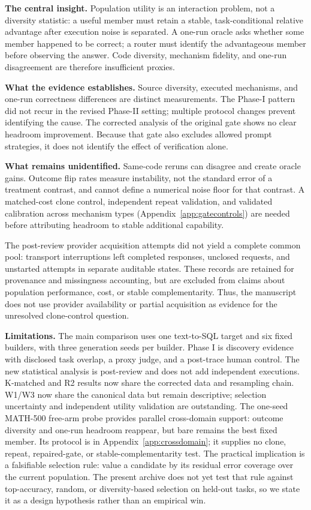 \textbf{The central insight.} Population utility is an interaction
problem, not a diversity statistic: a useful member must retain a stable,
task-conditional relative advantage after execution noise is separated. A
one-run oracle asks whether some member happened to be correct; a router must
identify the advantageous member before observing the answer. Code diversity,
mechanism fidelity, and one-run disagreement are therefore insufficient proxies.

\textbf{What the evidence establishes.} Source diversity, executed
mechanisms, and one-run correctness differences are distinct measurements.
The Phase-I pattern did not recur in the revised Phase-II setting; multiple
protocol changes prevent identifying the cause. The corrected analysis of
the original gate shows no clear headroom improvement. Because that gate
also excludes allowed prompt strategies, it does not identify the effect
of verification alone.

\textbf{What remains unidentified.} Same-code reruns can disagree and
create oracle gains. Outcome flip rates measure instability, not the
standard error of a treatment contrast, and cannot define a numerical
noise floor for that contrast. A matched-cost clone control, independent
repeat validation, and validated calibration across mechanism types
(Appendix~\ref{app:gatecontrols})
are needed before attributing headroom to stable additional capability.


The post-review provider acquisition attempts did not yield a complete common pool: transport interruptions left completed responses, unclosed requests, and unstarted attempts in separate auditable states. These records are retained for provenance and missingness accounting, but are excluded from claims about population performance, cost, or stable complementarity. Thus, the manuscript does not use provider availability or partial acquisition as evidence for the unresolved clone-control question.

\textbf{Limitations.} The main comparison uses one text-to-SQL target and
six fixed builders, with three generation seeds per builder. Phase I is
discovery evidence with disclosed task overlap, a proxy judge, and a
post-trace human control. The new statistical analysis is post-review and
does not add independent executions. K-matched and R2 results now share the
corrected data and resampling chain. W1/W3 now share the canonical data
but remain descriptive; selection uncertainty and independent utility
validation are outstanding.
The one-seed MATH-500 free-arm probe provides parallel cross-domain
support: outcome diversity and one-run headroom reappear, but bare remains
the best fixed member. Its protocol is in Appendix~\ref{app:crossdomain};
it supplies no clone, repeat, repaired-gate, or stable-complementarity test.
The practical implication is a falsifiable selection rule: value a candidate by
its residual error coverage over the current population. The present archive
does not yet test that rule against top-accuracy, random, or diversity-based
selection on held-out tasks, so we state it as a design hypothesis rather than
an empirical win.
